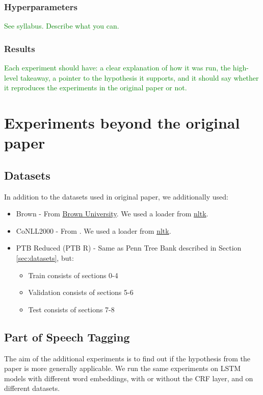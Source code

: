 \documentclass[11pt,a4paper]{article}
\begin{document}
    \subsubsection{Hyperparameters}
    \textcolor{green}{See syllabus. Describe what you can.}

    \subsubsection{Results}
    \textcolor{green}{Each experiment should have: a clear explanation of how it was run, the high-level takeaway, a pointer to the hypothesis it supports, and it should say whether it reproduces the experiments in the original paper or not.}

\section{Experiments beyond the original paper}

    \subsection{Datasets}
    In addition to the datasets used in original paper, we additionally used:
    \begin{itemize}
        \item Brown - From \href{http://korpus.uib.no/icame/brown/bcm.html}{Brown University}. We used a loader from \href{https://www.nltk.org/}{nltk}.
        \item CoNLL2000 - From \cite{conll2000}. We used a loader from \href{https://www.nltk.org/}{nltk}.
        \item PTB Reduced (PTB R) - Same as Penn Tree Bank described in Section \ref{sec:datasets}, but:
        \begin{itemize}
            \item Train consists of sections 0-4
            \item Validation consists of sections 5-6
            \item Test consists of sections 7-8
        \end{itemize}
    \end{itemize}

    \subsection{Part of Speech Tagging}
    The aim of the additional experiments is to find out if the hypothesis from the paper is more generally applicable. We run the same experiments on LSTM models with different word embeddings, with or without the CRF layer, and on different datasets.
\end{document}
